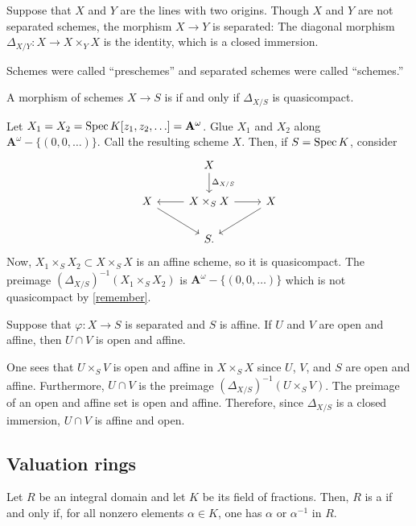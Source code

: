 \documentclass [11 pt, oneside] {article}
\begin{document}
\begin{example}[ ]\label{}\text{}
Suppose that $X$ and $Y$ are the lines with two origins. Though $X$ and $Y$ are not separated schemes, the morphism $X\longrightarrow Y$ is separated: The diagonal morphism $\Delta_{X/Y} :X\longrightarrow X\times_YX$ is the identity, which is a closed immersion.
\end{example}

\begin{remark}
	Schemes were called ``preschemes'' and separated schemes were called ``schemes.''
\end{remark}

\begin{definition}
	A morphism of schemes $X\longrightarrow S$ is  if and only if $\Delta_{X/S}$ is quasicompact.
\end{definition}

\begin{example}[ ]\label{}\text{}
Let $X_1=X_2 = \operatorname{Spec} K[z_1,z_2,\hdots]= \mathbf{A}^\omega$. Glue $X_1$ and $X_2$ along $\mathbf{A}^\omega - \{(0,0,\hdots) \}$. Call the resulting scheme $X$. Then, if $S=\operatorname{Spec} K$, consider 
\[
\begin{tikzcd}
	&X \ar[d, "\Delta_{X/S}"]\\
	X\ar[dr] & X\times_SX \ar[l]\ar[r] & X\ar[dl]\\
		 & S.
\end{tikzcd}
\]
Now, $X_1\times_S X_2\subset X\times_S X$ is an affine scheme, so it is quasicompact. The preimage $(\Delta_{X/S}) ^{-1} (X_1\times_S X_2)$ is $\mathbf{A}^\omega - \{(0,0,\hdots) \}$ which is not quasicompact by \cref{remember}. 
\end{example}

Suppose that $\varphi : X\longrightarrow S$ is separated and $S$ is affine. If $U$ and $V$ are open and affine, then $U\cap V$ is open and affine.

One sees that $U\times_SV$ is open and affine in $X\times_SX$ since $U$, $V$, and $S$ are open and affine. Furthermore, $U\cap V$ is the preimage $(\Delta_{X/S}) ^{-1} (U\times_S V)$. The preimage of an open and affine set is open and affine. Therefore, since $\Delta_{X/S}$ is a closed immersion, $U\cap V$ is affine and open.

\subsection{Valuation rings}
Let $R$ be an integral domain and let $K$ be its field of fractions. Then, $R$ is a  if and only if, for all nonzero elements $\alpha\in K$, one has $\alpha$ or $\alpha^{-1}$ in $R$.
\end{document}
